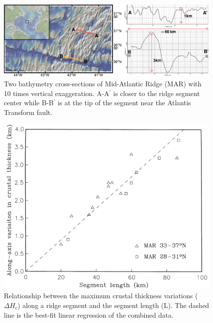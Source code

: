\begin{figure}[H]
 \centering
  \includegraphics[scale=0.4]{./Figures/fig_Intro2_1.png}
 \caption{\small{Two bathymetry cross-sections of Mid-Atlantic Ridge (MAR) with 10 times vertical exaggeration. A-A$^{\prime}$ is closer to the ridge segment center while B-B$^{\prime}$ is at the tip of the segment near the Atlantis Transform fault.}}
 \label{fig_Intro2_1}
\end{figure}

\begin{figure}[H]
 \centering
  \includegraphics[scale=0.3]{./Figures/fig_Intro3_1.png}
 \caption{\small{Relationship between the maximum crustal thickness variations ($\Delta H_{c}$) along a ridge segment and the segment length (L). The dashed line is the best-fit linear regression of the combined data. \citep{Chen1999}}}
 \label{fig_Intro3_1}
\end{figure}

%

